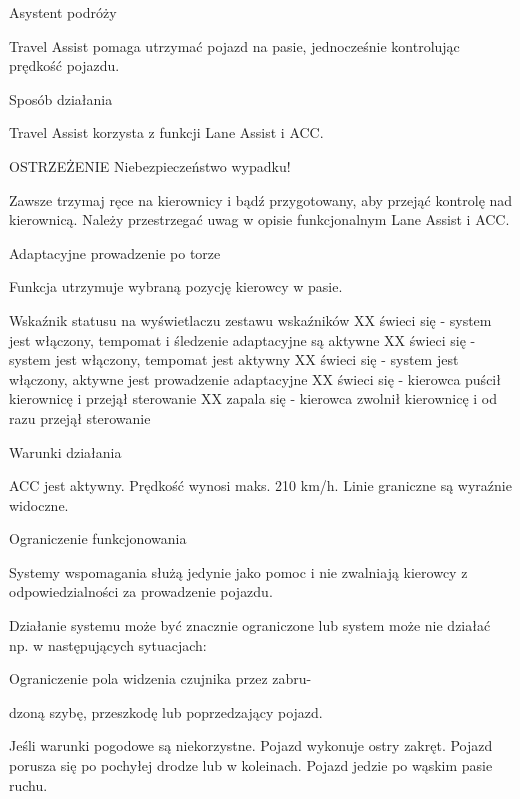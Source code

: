 Asystent podróży

Travel Assist pomaga utrzymać pojazd na pasie, jednocześnie kontrolując prędkość pojazdu.

Sposób działania

Travel Assist korzysta z funkcji Lane Assist i ACC.

OSTRZEŻENIE
Niebezpieczeństwo wypadku!
\begin{itemizeTriangle}
	\itemTriangle Zawsze trzymaj ręce na kierownicy i bądź przygotowany, aby przejąć kontrolę nad kierownicą.
	\itemTriangle Należy przestrzegać uwag w opisie funkcjonalnym Lane Assist i ACC.
\end{itemizeTriangle}

Adaptacyjne prowadzenie po torze

Funkcja utrzymuje wybraną pozycję kierowcy w pasie.

Wskaźnik statusu na wyświetlaczu zestawu wskaźników
XX świeci się - system jest włączony, tempomat i śledzenie adaptacyjne są aktywne
XX świeci się - system jest włączony, tempomat jest aktywny
XX świeci się - system jest włączony, aktywne jest prowadzenie adaptacyjne
XX świeci się - kierowca puścił kierownicę i przejął sterowanie
XX zapala się - kierowca zwolnił kierownicę i od razu przejął sterowanie

Warunki działania
\begin{itemizeTick}
	\itemTick ACC jest aktywny.
	\itemTick Prędkość wynosi maks. 210 km/h.
	\itemTick Linie graniczne są wyraźnie widoczne.
\end{itemizeTick}

Ograniczenie funkcjonowania

Systemy wspomagania służą jedynie jako pomoc i nie zwalniają kierowcy z odpowiedzialności za prowadzenie pojazdu.

Działanie systemu może być znacznie ograniczone lub system może nie działać np. w następujących sytuacjach:
\begin{itemizeTriangle}
	\itemTriangle Ograniczenie pola widzenia czujnika przez zabru-
\end{itemizeTriangle}
dzoną szybę, przeszkodę lub poprzedzający pojazd.
\begin{itemizeTriangle}
	\itemTriangle Jeśli warunki pogodowe są niekorzystne.
	\itemTriangle Pojazd wykonuje ostry zakręt.
	\itemTriangle Pojazd porusza się po pochyłej drodze lub w koleinach.
	\itemTriangle Pojazd jedzie po wąskim pasie ruchu.
\end{itemizeTriangle}

